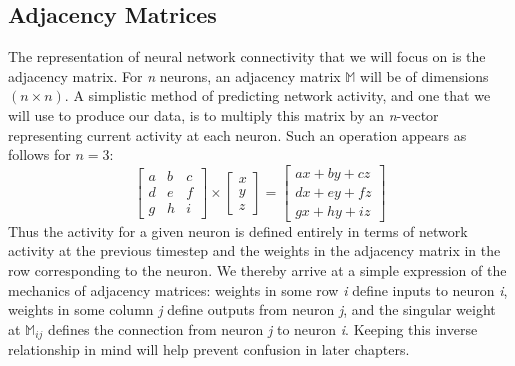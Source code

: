 \subsection{Adjacency Matrices}
The representation of neural network connectivity that we will focus on is the 
adjacency matrix. For \textit{n} neurons, an adjacency matrix $\mathbb{M}$ will 
be of dimensions $(n \times n)$. A simplistic method of predicting network 
activity, and one that we will use to produce our data, is to multiply this 
matrix by an \textit{n}-vector representing current activity at each neuron.  
Such an operation appears as follows for $n=3$:
\[ \begin{bmatrix}
		a & b & c\\
		d & e & f\\
		g & h & i
	\end{bmatrix}
	\times
	\begin{bmatrix}
		x\\
		y\\
		z
	\end{bmatrix}
	=
	\begin{bmatrix}
		ax + by + cz\\
		dx + ey + fz\\
		gx + hy + iz
	\end{bmatrix}
\]
Thus the activity for a given neuron is defined entirely in terms of network 
activity at the previous timestep and the weights in the adjacency matrix in the 
row corresponding to the neuron. We thereby arrive at a simple expression of the 
mechanics of adjacency matrices: weights in some row \textit{i} define inputs to 
neuron \textit{i}, weights in some column \textit{j} define outputs from neuron 
\textit{j}, and the singular weight at $\mathbb{M}_{ij}$ defines the connection 
from neuron \textit{j} to neuron \textit{i}. Keeping this inverse relationship 
in mind will help prevent confusion in later chapters.
